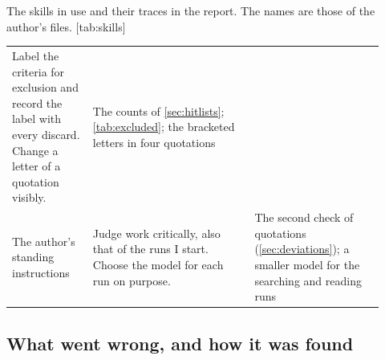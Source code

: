 \begin{table}
\begin{sidecaption}{%
    The skills in use and their traces in the report.
    The names are those of the author's files.
  }[tab:skills]
\begin{tabular}{@{}L{0.20\linewidth}L{0.40\linewidth}L{0.32\linewidth}@{}}
          Label the criteria for exclusion and record the label with
          every discard.
          Change a letter of a quotation visibly.
        & The counts of \cref{sec:hitlists}; \cref{tab:excluded}; the
          bracketed letters in four quotations \\
      The author's standing instructions
        & Judge work critically, also that of the runs I start.
          Choose the model for each run on purpose.
        & The second check of quotations (\cref{sec:deviations}); a
          smaller model for the searching and reading runs \\
      \bottomrule
    \end{tabular}
  \end{sidecaption}
\end{table}

\subsection{What went wrong, and how it was found}\label{sec:wrong}

